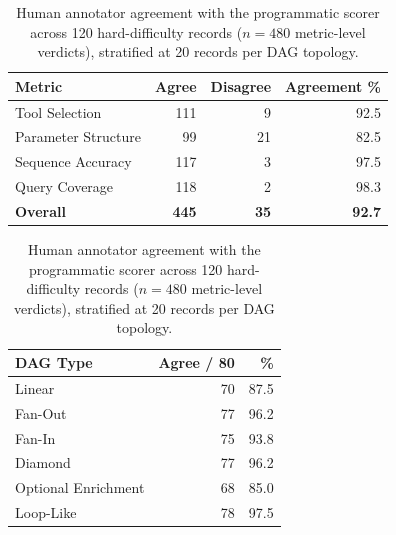 \begin{table}[h!]
\centering
\small
\setlength{\tabcolsep}{6pt}
\renewcommand{\arraystretch}{1.15}
\begin{tabularx}{\columnwidth}{@{}Xrrr@{}}
\toprule
\textbf{Metric} & \textbf{Agree} & \textbf{Disagree} & \textbf{Agreement \%} \\
\midrule
Tool Selection          & 111 &  9 & 92.5 \\
Parameter Structure     &  99 & 21 & 82.5 \\
Sequence Accuracy       & 117 &  3 & 97.5 \\
Query Coverage          & 118 &  2 & 98.3 \\
\midrule
\textbf{Overall}        & \textbf{445} & \textbf{35} & \textbf{92.7} \\
\bottomrule
\end{tabularx}

\begin{tabularx}{\columnwidth}{@{}Xrr@{}}
\toprule
\textbf{DAG Type} & \textbf{Agree / 80} & \textbf{\%} \\
\midrule
Linear              & 70 & 87.5 \\
Fan-Out             & 77 & 96.2 \\
Fan-In              & 75 & 93.8 \\
Diamond             & 77 & 96.2 \\
Optional Enrichment & 68 & 85.0 \\
Loop-Like           & 78 & 97.5 \\
\bottomrule
\end{tabularx}
\caption{Human annotator agreement with the programmatic scorer across 120 hard-difficulty records ($n{=}480$ metric-level verdicts), stratified at 20 records per DAG topology.}
\label{tab:prog-judge-agree}

\end{table}

